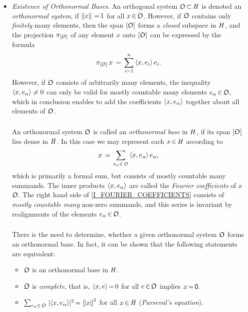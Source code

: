 \documentclass[11pt,twoside]{article}
\begin{document}
\begin{itemize}[leftmargin=12pt,itemsep=5pt]
\item[4.] \textit{Existence of Orthonormal Bases}.
An orthogonal system $\mathfrak{O} {\,\subset\,} \mathit{H}$ is denoted
an \textit{orthonormal system},
if $\left\lVert x \right\rVert {\,=\,} 1$ for all $x {\,\in\,} \mathfrak{O}$.
However,
if $\mathfrak{O}$ contains only \textit{finitely} many elements,
then the span $[\mathfrak{O}]$ forms a \textit{closed} subspace in $\mathit{H}$,
and the projection $\pi_{[\mathfrak{O}]}$ of any element $x$ onto $[\mathfrak{O}]$
can be expressed by the formula
\[
\pi_{[\mathfrak{O}]} \, x \,=\, \sum_{i=1}^n \, \langle x,e_i \rangle \, e_i.
\]
However,
if $\mathfrak{O}$ consists of arbitrarily many elements,
the inequality $\langle x,e_{\alpha} \rangle \neq 0$ can only be valid
for mostly countable many elements $e_{\alpha} {\,\in\,} \mathfrak{O}$,
which in conclusion enables to add the coefficients $\langle x,e_{\alpha} \rangle$
together about all elements of $\mathfrak{O}$.

\subparagraph{} %
An orthonormal system $\mathfrak{O}$ is called
an \textit{orthonormal base} in $\mathit{H}$,
if its span $[ \mathfrak{O} ]$ lies dense in $\mathit{H}$.
In this case we may represent each $x {\,\in\,} \mathit{H}$ according to
\begin{equation}\label{I_FOURIER_COEFFICIENTS}
x \,=\, \sum_{e_{\alpha} \in \, \mathfrak{O}} \, \langle x,e_{\alpha} \rangle \, e_{\alpha},
\end{equation}
which is primarily a formal sum,
but consists of mostly countable many summands.
The inner products $\langle x,e_{\alpha} \rangle$ are called
the \textit{Fourier coefficients} of $x$ {\wrt} $\mathfrak{O}$.
The right hand side of \eqref{I_FOURIER_COEFFICIENTS}
consists of \textit{mostly countable many} non-zero summands,
and this series is invariant
by realignments of the elements $e_{\alpha} {\,\in\,} \mathfrak{O}$.

\subparagraph{}
There is the need to determine,
whether a given orthonormal system $\mathfrak{O}$ forms an orthonormal base.
In fact,
it can be shown that
the following statements are equivalent:

\begin{itemize}[leftmargin=20pt]
\item[(a)]
$\mathfrak{O}$ is an orthonormal base in $\mathit{H}$.

\item[(b)]
$\mathfrak{O}$ is \textit{complete},
that is,
$\langle x,e \rangle {\,=\,} 0$ for all $e {\,\in\,} \mathfrak{O}$ implies $x {\,=\,} {\mathsf{0}}$.

\item[(c)]
$\sum_{e_{\alpha} \in \,\orthO} \;
\abs{ \scalar{x}{e_{\alpha}} } ^2 \eq \norm{x}^2$ for all $x {\,\in\,} \mathit{H}$
(\textit{Parseval}\textit{'s equation}).
\end{itemize}


\end{itemize}
\end{document}
